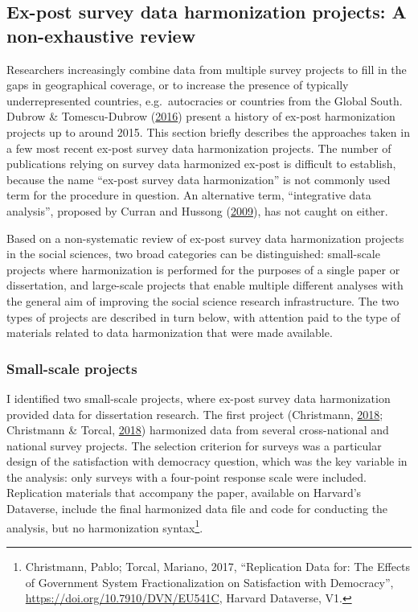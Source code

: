 \documentclass[12pt,]{article}
\let\rmarkdownfootnote\footnote%
\def\footnote{\protect\rmarkdownfootnote}
\begin{document}
\hypertarget{ex-post-survey-data-harmonization-projects-a-non-exhaustive-review}{%
\subsection{Ex-post survey data harmonization projects: A non-exhaustive review}\label{ex-post-survey-data-harmonization-projects-a-non-exhaustive-review}}

Researchers increasingly combine data from multiple survey projects to fill in the gaps in geographical coverage, or to increase the presence of typically underrepresented countries, e.g.~autocracies or countries from the Global South. Dubrow \& Tomescu-Dubrow (\protect\hyperlink{ref-Dubrow2016}{2016}) present a history of ex-post harmonization projects up to around 2015. This section briefly describes the approaches taken in a few most recent ex-post survey data harmonization projects. The number of publications relying on survey data harmonized ex-post is difficult to establish, because the name ``ex-post survey data harmonization'' is not commonly used term for the procedure in question. An alternative term, ``integrative data analysis'', proposed by Curran and Hussong (\protect\hyperlink{ref-Curran2009}{2009}), has not caught on either.

Based on a non-systematic review of ex-post survey data harmonization projects in the social sciences, two broad categories can be distinguished: small-scale projects where harmonization is performed for the purposes of a single paper or dissertation, and large-scale projects that enable multiple different analyses with the general aim of improving the social science research infrastructure. The two types of projects are described in turn below, with attention paid to the type of materials related to data harmonization that were made available.

\hypertarget{small-scale-projects}{%
\subsubsection{Small-scale projects}\label{small-scale-projects}}

I identified two small-scale projects, where ex-post survey data harmonization provided data for dissertation research. The first project (Christmann, \protect\hyperlink{ref-Christmann2018}{2018}; Christmann \& Torcal, \protect\hyperlink{ref-Christmann2018a}{2018}) harmonized data from several cross-national and national survey projects. The selection criterion for surveys was a particular design of the satisfaction with democracy question, which was the key variable in the analysis: only surveys with a four-point response scale were included. Replication materials that accompany the paper, available on Harvard's Dataverse, include the final harmonized data file and code for conducting the analysis, but no harmonization syntax\footnote{Christmann, Pablo; Torcal, Mariano, 2017, ``Replication Data for: The Effects of Government System Fractionalization on Satisfaction with Democracy'', \url{https://doi.org/10.7910/DVN/EU541C}, Harvard Dataverse, V1.}.
\end{document}
